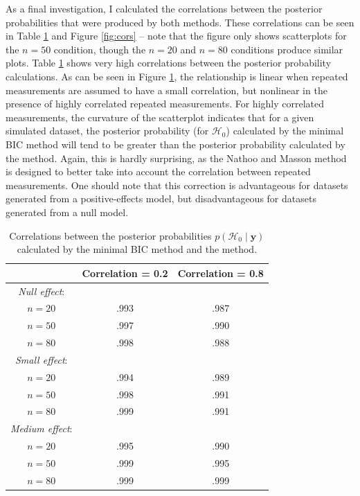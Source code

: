 \documentclass[12pt,twoside,a4paper]{article}
\begin{document}
As a final investigation, I calculated the correlations between the posterior probabilities that were produced by both methods. These correlations can be seen in Table \ref{tab:cors} and Figure \ref{fig:cors} -- note that the figure only shows scatterplots for the $n=50$ condition, though the $n=20$ and $n=80$ conditions produce similar plots. Table \ref{tab:cors} shows very high correlations between the posterior probability calculations. As can be seen in Figure \ref{tab:cors}, the relationship is linear when repeated measurements are assumed to have a small correlation, but nonlinear in the presence of highly correlated repeated measurements. For highly correlated measurements, the curvature of the scatterplot indicates that for a given simulated dataset, the posterior probability (for $\mathcal{H}_0$) calculated by the minimal BIC method will tend to be greater than the posterior probability calculated by the \citet{nathoo2016} method. Again, this is hardly surprising, as the Nathoo and Masson method is designed to better take into account the correlation between repeated measurements. One should note that this correction is advantageous for datasets generated from a positive-effects model, but disadvantageous for datasets generated from a null model. 

\begin{table}
  \centering \small

  \begin{tabular}{ccc}
    & Correlation = 0.2 & Correlation = 0.8\\
    \hline
    {\it Null effect}:\\
    $n=20$ & .993 & .987\\
    $n=50$ & .997 & .990\\
    $n=80$ & .998 & .988\\[2mm]

    {\it Small effect}:\\
    $n=20$ & .994 & .989\\
    $n=50$ & .998 & .991\\
    $n=80$ & .999 & .991\\[2mm]

    {\it Medium effect}:\\
    $n=20$ & .995 & .990\\
    $n=50$ & .999 & .995\\
    $n=80$ & .999 & .999\\
    \hline
  
  \end{tabular}
  \caption{Correlations between the posterior probabilities $p(\mathcal{H}_0\mid \bm{y})$ calculated by the minimal BIC method and the \citet{nathoo2016} method.}
  \label{tab:cors}
\end{table}
\end{document}

